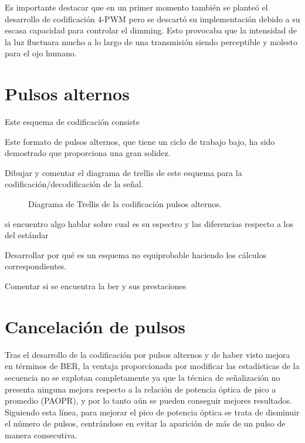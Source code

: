 Es importante destacar que en un primer momento también se planteó el desarrollo de codificación 4-PWM pero se descartó su 
implementación debido a su escasa capacidad para controlar el dimming. Esto provocaba que la intensidad de la luz 
fluctuara mucho a lo largo de una transmisión siendo perceptible y molesto para el ojo humano.

\section{Pulsos alternos}
Este esquema de codificación consiste 

Este formato de pulsos alternos, que tiene un ciclo de trabajo bajo, ha sido
demostrado que proporciona una gran solidez.

Dibujar y comentar el diagrama de trellis de este esquema para la codificación/decodificación de la señal.
\vspace{2cm}

\begin{figure}[ht]
    \centering
    
    \caption{\small{Diagrama de Trellis de la codificación pulsos alternos.}}
    \label{trellis_alternos}%
\end{figure}

si encuentro algo hablar sobre cual es su espectro y las diferencias respecto a los del estándar

Desarrollar por qué es un esquema no equiprobable haciendo los cálculos correspondientes.

Comentar si se encuentra la ber y sus prestaciones

\section{Cancelación de pulsos}

Tras el desarrollo de la codificación por pulsos alternos y de haber visto mejora en 
términos de BER, la ventaja proporcionada por modificar las estadísticas de la secuencia
no se explotan completamente ya que la técnica de señalización no presenta ninguna mejora
respecto a la relación de potencia óptica de pico a promedio (PAOPR), y por lo tanto aún
se pueden conseguir mejores resultados. Siguiendo esta línea, para mejorar el pico de 
potencia óptica se trata de disminuir el número de pulsos, centrándose en evitar la 
aparición de más de un pulso de manera consecutiva. 

